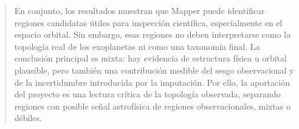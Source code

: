 \begin{abstract}
En conjunto, los resultados muestran que Mapper puede identificar regiones candidatas útiles para inspección científica, especialmente en el espacio orbital. Sin embargo, esas regiones no deben interpretarse como la topología real de los exoplanetas ni como una taxonomía final. La conclusión principal es mixta: hay evidencia de estructura física u orbital plausible, pero también una contribución medible del sesgo observacional y de la incertidumbre introducida por la imputación. Por ello, la aportación del proyecto es una lectura crítica de la topología observada, separando regiones con posible señal astrofísica de regiones observacionales, mixtas o débiles.


\end{abstract}
